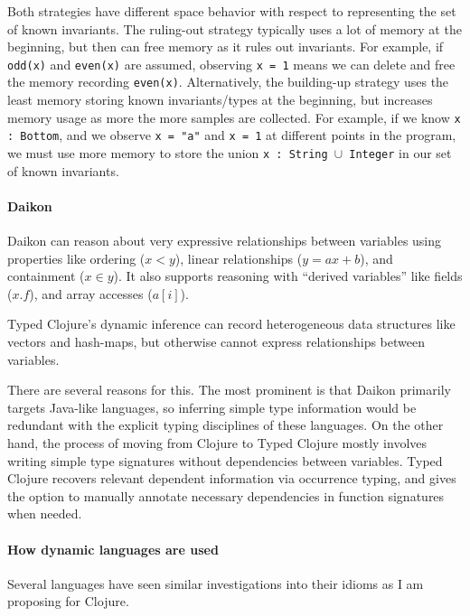 \documentclass[9pt]{extarticle}
\begin{document}
Both strategies have different space behavior with respect to representing
the set of known invariants.
The ruling-out strategy typically uses a lot of memory at the beginning,
but then can free memory as it rules out invariants. For example, if
\texttt{odd(x)} and \texttt{even(x)} are assumed, observing \texttt{x = 1}
means we can delete and free the memory recording \texttt{even(x)}.
Alternatively, the building-up strategy uses the least memory storing
known invariants/types at the beginning, but increases memory usage
as more the more samples are collected. For example, if we know
\texttt{x : Bottom}, and we observe \texttt{x = "a"} and \texttt{x = 1}
at different points in the program, we must use more memory to
store the union \texttt{x : String $\cup$ Integer} in our set of known invariants.

\paragraph{Daikon}
Daikon can reason about very expressive relationships between variables
using properties like ordering ($x < y$), linear relationships ($y = ax + b$),
and containment ($x \in y$). It also supports reasoning with ``derived variables''
like fields ($x.f$), and array accesses ($a[i]$).

Typed Clojure's dynamic inference can record heterogeneous data structures
like vectors and hash-maps, but otherwise cannot express relationships
between variables.

There are several reasons for this. The most prominent is that Daikon
primarily targets Java-like languages, so inferring simple type information
would be redundant with the explicit typing disciplines of these languages.
On the other hand, the process of moving from Clojure to Typed Clojure
mostly involves writing simple type signatures without dependencies
between variables. Typed Clojure recovers relevant dependent information
via occurrence typing, and gives the option to manually annotate necessary
dependencies in function signatures when needed.


\paragraph{How dynamic languages are used}
Several languages have seen similar investigations
into their idioms as I am proposing for Clojure.
\end{document}
